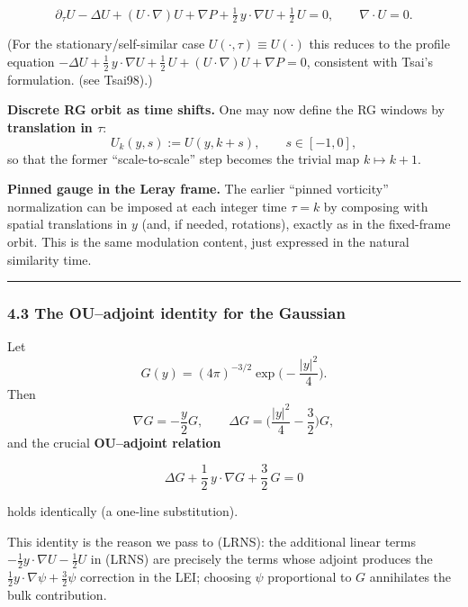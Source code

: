 \documentclass[
  11pt,
]{article}
\begin{document}
\begin{equation}
\partial_\tau U-\Delta U+(U\cdot\nabla)U+\nabla P+\tfrac12\,y\cdot\nabla U+\tfrac12\,U=0,
\qquad \nabla\cdot U=0.
\tag{LRNS}
\end{equation}

(For the stationary/self-similar case \(U(\cdot,\tau)\equiv U(\cdot)\) this reduces to the profile equation \(-\Delta U+\tfrac12\,y\cdot\nabla U+\tfrac12\,U+(U\cdot\nabla)U+\nabla P=0\), consistent with Tsai's formulation. (see Tsai98).)

\textbf{Discrete RG orbit as time shifts.} One may now define the RG windows by \textbf{translation in \(\tau\)}: \[
U_k(y,s):=U(y,k+s),\qquad s\in[-1,0],
\] so that the former ``scale-to-scale'' step becomes the trivial map \(k\mapsto k+1\).

\textbf{Pinned gauge in the Leray frame.} The earlier ``pinned vorticity'' normalization can be imposed at each integer time \(\tau=k\) by composing with spatial translations in \(y\) (and, if needed, rotations), exactly as in the fixed-frame orbit. This is the same modulation content, just expressed in the natural similarity time.

\begin{center}\rule{0.5\linewidth}{0.5pt}\end{center}

\hypertarget{the-ouadjoint-identity-for-the-gaussian}{%
\subsubsection{4.3 The OU--adjoint identity for the Gaussian}\label{the-ouadjoint-identity-for-the-gaussian}}

Let \[
G(y)=(4\pi)^{-3/2}\exp\!\Big(-\frac{|y|^2}{4}\Big).
\] Then \[
\nabla G =-\frac{y}{2}G,\qquad 
\Delta G =\Big(\frac{|y|^2}{4}-\frac32\Big)G,
\] and the crucial \textbf{OU--adjoint relation}

\begin{equation}
\Delta G+\frac12\,y\cdot\nabla G+\frac32\,G=0
\tag{OU*}
\end{equation}

holds identically (a one-line substitution).

This identity is the reason we pass to (LRNS): the additional linear terms \(-\tfrac12 y\cdot\nabla U-\tfrac12 U\) in (LRNS) are precisely the terms whose adjoint produces the \(\tfrac12 y\cdot\nabla\psi+\tfrac32\psi\) correction in the LEI; choosing \(\psi\) proportional to \(G\) annihilates the bulk contribution.
\end{document}
